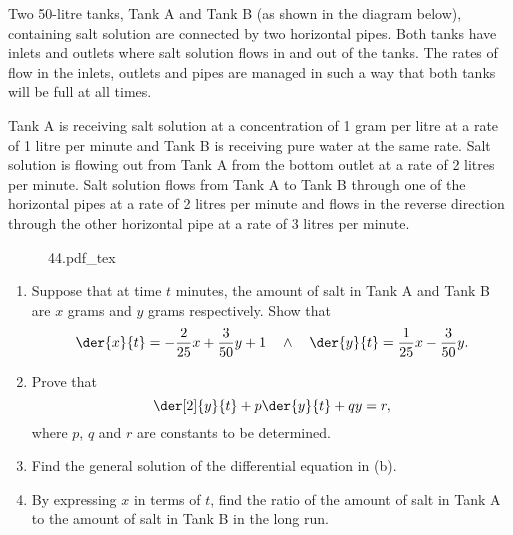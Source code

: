 \begin{problem}
    Two 50-litre tanks, Tank A and Tank B (as shown in the diagram below), containing salt solution are connected by two horizontal pipes. Both tanks have inlets and outlets where salt solution flows in and out of the tanks. The rates of flow in the inlets, outlets and pipes are managed in such a way that both tanks will be full at all times.

    Tank A is receiving salt solution at a concentration of 1 gram per litre at a rate of 1 litre per minute and Tank B is receiving pure water at the same rate. Salt solution is flowing out from Tank A from the bottom outlet at a rate of 2 litres per minute. Salt solution flows from Tank A to Tank B through one of the horizontal pipes at a rate of 2 litres per minute and flows in the reverse direction through the other horizontal pipe at a rate of 3 litres per minute.

    \begin{figure}[H]
        \centering
        {44.pdf_tex}
    \end{figure}

    \begin{enumerate}
        \item Suppose that at time $t$ minutes, the amount of salt in Tank A and Tank B are $x$ grams and $y$ grams respectively. Show that \[\der{x}{t} = -\frac2{25} x + \frac3{50} y + 1 \quad \land \quad \der{y}{t} = \frac1{25} x - \frac3{50} y.\]
        \item Prove that \[\der[2]{y}{t} + p \der{y}{t} + qy = r,\] where $p$, $q$ and $r$ are constants to be determined.
        \item Find the general solution of the differential equation in (b).
        \item By expressing $x$ in terms of $t$, find the ratio of the amount of salt in Tank A to the amount of salt in Tank B in the long run.
    \end{enumerate}
\end{problem}

